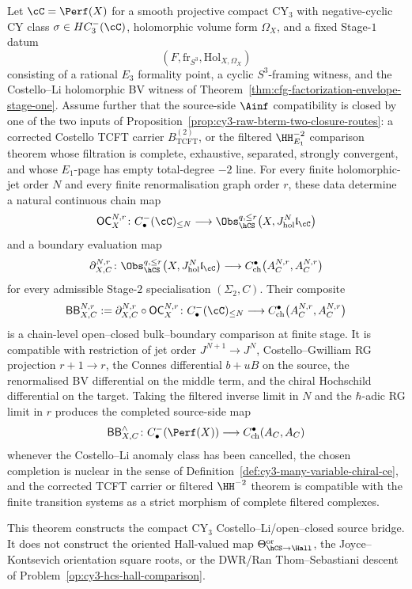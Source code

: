 \begin{theorem}
\label{thm:compact-cy3-finite-stage-open-closed-source}
Let $\cC=\Perf(X)$ for a smooth projective compact CY$_3$ with
negative-cyclic CY class $\sigma\in HC^-_3(\cC)$, holomorphic volume form
$\Omega_X$, and a fixed Stage-$1$ datum
\[
 (F,\mathrm{fr}_{S^3},\mathrm{Hol}_{X,\Omega_X})
\]
consisting of a rational $E_3$ formality point, a cyclic
$S^3$-framing witness, and the Costello--Li holomorphic BV witness of
Theorem~\ref{thm:cfg-factorization-envelope-stage-one}. Assume further
that the source-side $\Ainf$ compatibility is closed by one of the two
inputs of Proposition~\ref{prop:cy3-raw-bterm-two-closure-routes}: a
corrected Costello TCFT carrier $B_{\mathrm{TCFT}}^{(2)}$, or the
filtered $\HH^{-2}_{E_1}$ comparison theorem whose filtration is
complete, exhaustive, separated, strongly convergent, and whose
$E_1$-page has empty total-degree $-2$ line. For every finite
holomorphic-jet order $N$ and every finite renormalisation graph order
$r$, these data determine a natural continuous chain map
\[
 \mathsf{OC}^{N,r}_{X}\colon
 C^-_\bullet(\cC)_{\leq N}
 \longrightarrow
 \Obs_{\hCS}^{q,\leq r}
 \bigl(X,J^N_{\mathrm{hol}}\mathfrak l_{\cC}\bigr)
\]
and a boundary evaluation map
\[
 \partial^{N,r}_{X,C}\colon
 \Obs_{\hCS}^{q,\leq r}
 \bigl(X,J^N_{\mathrm{hol}}\mathfrak l_{\cC}\bigr)
 \longrightarrow
 C^\bullet_{\mathrm{ch}}
 \bigl(A_C^{N,r},A_C^{N,r}\bigr)
\]
for every admissible Stage-$2$ specialisation $(\Sigma_2,C)$. Their
composite
\[
 \mathsf{BB}^{N,r}_{X,C}
 :=
 \partial^{N,r}_{X,C}\circ \mathsf{OC}^{N,r}_X
 \colon
 C^-_\bullet(\cC)_{\leq N}
 \longrightarrow
 C^\bullet_{\mathrm{ch}}
 \bigl(A_C^{N,r},A_C^{N,r}\bigr)
\]
is a chain-level open--closed bulk--boundary comparison at finite
stage. It is compatible with restriction of jet order
$J^{N+1}\to J^N$, Costello--Gwilliam RG projection
$r+1\to r$, the Connes differential $b+uB$ on the source, the
renormalised BV differential on the middle term, and the chiral
Hochschild differential on the target. Taking the filtered inverse
limit in $N$ and the $\hbar$-adic RG limit in $r$ produces the completed
source-side map
\[
 \mathsf{BB}^{\wedge}_{X,C}\colon
 C^-_\bullet(\Perf(X))
 \longrightarrow
 C^\bullet_{\mathrm{ch}}(A_C,A_C)
\]
whenever the Costello--Li anomaly class has been cancelled, the chosen
completion is nuclear in the sense of
Definition~\ref{def:cy3-many-variable-chiral-ce}, and the corrected
TCFT carrier or filtered $\HH^{-2}$ theorem is compatible with the
finite transition systems as a strict morphism of complete filtered
complexes.

This theorem constructs the compact CY$_3$ Costello--Li/open--closed
source bridge. It does not construct the oriented Hall-valued map
$\Theta_{\hCS\to\Hall}^{\mathrm{or}}$, the Joyce--Kontsevich
orientation square roots, or the DWR/Ran Thom--Sebastiani descent of
Problem~\ref{op:cy3-hcs-hall-comparison}.
\end{theorem}

